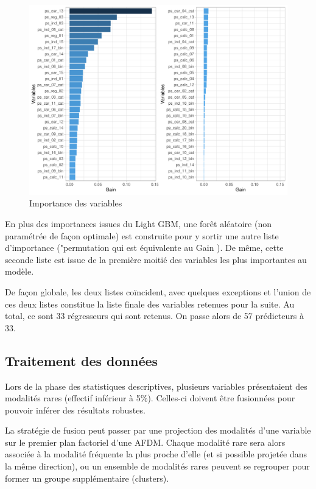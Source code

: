 \documentclass[french]{article}
\begin{document}
\begin{multicols}{2}
\begin{figure}[H] \centering
  \includegraphics[width = \columnwidth]{img/var_imp_lgb}
  \caption{Importance des variables}
\end{figure}


En plus des importances issues du Light GBM, une forêt aléatoire (non paramétrée de façon optimale) est construite pour y sortir une autre liste d'importance ("\og permutation \fg{} qui est équivalente au \og Gain \fg{}). De même, cette seconde liste est issue de la première moitié des variables les plus importantes au modèle.

De façon globale, les deux listes coïncident, avec quelques exceptions et l'union de ces deux listes constitue la liste finale des variables retenues pour la suite. Au total, ce sont 33 régresseurs qui sont retenus. On passe alors de 57 prédicteurs à 33.

\subsection{Traitement des données}

Lors de la phase des statistiques descriptives, plusieurs variables présentaient des modalités rares (effectif inférieur à 5\%). Celles-ci doivent être fusionnées pour pouvoir inférer des résultats robustes.

La stratégie de fusion peut passer par une projection des modalités d'une variable sur le premier plan factoriel d'une AFDM. Chaque modalité rare sera alors associée à la modalité fréquente la plus proche d'elle (et si possible projetée dans la même direction), ou un ensemble de modalités rares peuvent se regrouper pour former un groupe supplémentaire (clusters).


\end{multicols}
\end{document}
